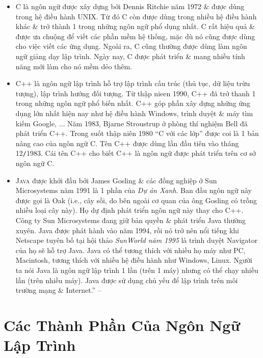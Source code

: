 \documentclass[oneside]{book}
\numberwithin{equation}{section}
\begin{document}
\begin{itemize}
	\item C là ngôn ngữ được xây dựng bởi Dennis Ritchie năm 1972 \& được dùng trong hệ điều hành UNIX. Từ đó C còn được dùng trong nhiều hệ điều hành khác \& trở thành 1 trong những ngôn ngữ phổ dụng nhất. C rất hiệu quả \& được ưa chuộng để viết các phần mềm hệ thống, mặc dù nó cũng được dùng cho việc viết các ứng dụng. Ngoài ra, C cũng thường được dùng làm ngôn ngữ giảng dạy lập trình. Ngày nay, C được phát triển \& mang nhiều tính năng mới làm cho nó mềm dẻo thêm.
	\item C++ là ngôn ngữ lập trình hỗ trợ lập trình cấu trúc (thủ tục, dữ liệu trừu tượng), lập trình hướng đối tượng. Từ thập nieen 1990, C++ đã trở thanh 1 trong những ngôn ngữ phổ biến nhất. C++ góp phần xây dựng những ứng dụng lớn nhất hiện nay như hệ điều hành Windows, trình duyệt \& máy tìm kiếm Google, $\ldots$ Năm 1983, Bjarne Stroustrup ở phòng thí nghiệm Bell đã phát triển C++. Trong suốt thập niên 1980 ``C với các lớp'' được coi là 1 bản nâng cao của ngôn ngữ C. Tên C++ được dùng lần đầu tiên vào tháng 12\texttt{/}1983. Cái tên C++ cho biết C++ là ngôn ngữ được phát triển trên cơ sở ngôn ngữ C.
	\item \textsc{Java} được khởi đầu bởi James Gosling \& các đồng nghiệp ở Sun Microsystems năm 1991 là 1 phần của \textit{Dự án Xanh}. Ban đầu ngôn ngữ này được gọi là Oak (i.e., cây sồi, do bên ngoài cơ quan của ông Gosling có trồng nhiều loại cây này). Họ dự định phát triển ngôn ngữ này thay cho C++. Công ty Sun Microsystems đang giữ bản quyền \& phát triển Java thường xuyên. Java được phát hành vào năm 1994, rồi nó trở nên nổi tiếng khi Netscape tuyên bố tại hội thảo \textit{SunWorld năm 1995} là trình duyệt Navigator của họ sẽ hỗ trợ Java. Java có thể tương thích với nhiều họ máy như PC, Macintosh, tương thích với nhiều hệ điều hành như Windows, Linux. Người ta nói Java là ngôn ngữ lập trình 1 lần (trên 1 máy) nhưng có thể chạy nhiều lần (trên nhiều máy). Java được sử dụng chủ yếu để lập trình trên môi trường mạng \& Internet.'' -- \cite[pp. 6--8]{SGK_Tin_Hoc_11}
\end{itemize}


\section{Các Thành Phần Của Ngôn Ngữ Lập Trình}
\end{document}
